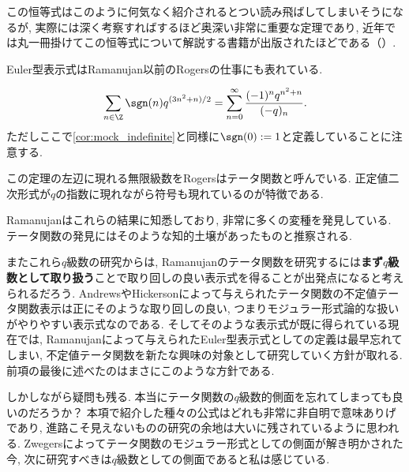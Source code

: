\documentclass[11pt,b5paper,oneside,lualatex]{ltjsarticle} %
\numberwithin{equation}{section} %
\begin{document}
この恒等式はこのように何気なく紹介されるとつい読み飛ばしてしまいそうになるが, 実際には深く考察すればするほど奥深い非常に重要な定理であり, 近年では丸一冊掛けてこの恒等式について解説する書籍が出版されたほどである（\cite{魅惑}）. 

Euler型表示式はRamanujan以前のRogersの仕事にも表れている. 

\begin{thm}
	\begin{align}	
		\sum_{n \in \Z} \sgn(n) q^{(3n^2 + n)/2}
		=
		\sum_{n=0}^{\infty} \frac{(-1)^n q^{n^2 + n}}{(-q)_n}.
	\end{align}
	ただしここで\cref{cor:mock_indefinite}と同様に$ \sgn(0) := 1 $と定義していることに注意する. 
\end{thm}

この定理の左辺に現れる無限級数をRogersはテータ関数と呼んでいる. 
正定値二次形式が$ q $の指数に現れながら符号も現れているのが特徴である. 

Ramanujanはこれらの結果に知悉しており, 非常に多くの変種を発見している. 
テータ関数の発見にはそのような知的土壌があったものと推察される. 

またこれら$ q $級数の研究からは, Ramanujanのテータ関数を研究するには\textbf{まず$ q $級数として取り扱う}ことで取り回しの良い表示式を得ることが出発点になると考えられるだろう. 
AndrewsやHickersonによって与えられたテータ関数の不定値テータ関数表示は正にそのような取り回しの良い, つまりモジュラー形式論的な扱いがやりやすい表示式なのである. 
そしてそのような表示式が既に得られている現在では, Ramanujanによって与えられたEuler型表示式としての定義は最早忘れてしまい, 不定値テータ関数を新たな興味の対象として研究していく方針が取れる. 
前項の最後に述べたのはまさにこのような方針である. 

しかしながら疑問も残る. 
本当にテータ関数の$ q $級数的側面を忘れてしまっても良いのだろうか？
本項で紹介した種々の公式はどれも非常に非自明で意味ありげであり, 進路こそ見えないものの研究の余地は大いに残されているように思われる. 
Zwegersによってテータ関数のモジュラー形式としての側面が解き明かされた今, 次に研究すべきは$ q $級数としての側面であると私は感じている. 
\end{document}
